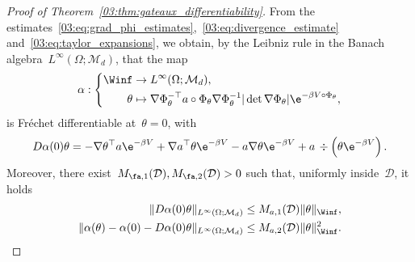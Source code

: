 \begin{proof}[Proof of Theorem~\ref{03:thm:gateaux_differentiability}]
    From the estimates~\eqref{03:eq:grad_phi_estimates},~\eqref{03:eq:divergence_estimate} and~\eqref{03:eq:taylor_expansions}, we obtain, by the Leibniz rule in the Banach algebra~$L^\infty(\Omega;\mathcal M_d)$, that the map
    \begin{equation}
        \label{03:eq:matrix_expr}
        \alpha:\left\{\begin{aligned}
            \Winf&\rightarrow  L^\infty(\Omega;\mathcal M_d),\\
            \theta & \mapsto\nabla \Phi_\theta^{-\top} a\circ \Phi_\theta \nabla \Phi_\theta^{-1}|\det \nabla \Phi_\theta| \e^{-\beta V\circ \Phi_\theta},
        \end{aligned}\right.
    \end{equation}
    is Fréchet differentiable at~$\theta = 0$, with
    \begin{equation}
        D\alpha(0)\theta = -\nabla\theta^\top a \e^{-\beta V} + \nabla a^\top\theta \e^{-\beta V} -a\nabla\theta\e^{-\beta V} + a\,\div\left(\theta\e^{-\beta V}\right).
    \end{equation}
    Moreover, there exist~$M_{\fa,1}(\mathcal D),M_{\fa,2}(\mathcal D)>0$ such that, uniformly inside~$\mathcal D$, it holds
    \begin{equation}
        \label{03:eq:dalpha_estimates}
        \begin{aligned}
            \|D\alpha(0)\theta\|_{L^\infty(\Omega;\mathcal M_d)} &\leq M_{a,1}(\mathcal D)\|\theta\|_{\Winf},\\
            \|\alpha(\theta)- \alpha(0)-D\alpha(0)\theta\|_{L^\infty(\Omega;\mathcal M_d)} & \leq M_{a,2}(\mathcal D)\|\theta\|_{\Winf}^2.
        \end{aligned}
    \end{equation}


\end{proof}
